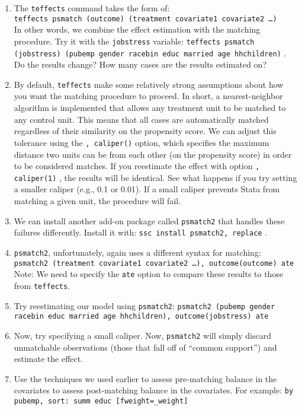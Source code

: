 \documentclass[a4paper,12pt]{article}
\begin{document}
\begin{enumerate}
\item The \texttt{teffects} command takes the form of:\\ \texttt{teffects psmatch (outcome) (treatment covariate1 covariate2 \dots)}\\ In other words, we combine the effect estimation with the matching procedure. Try it with the \texttt{jobstress} variable: \texttt{teffects psmatch (jobstress) (pubemp gender racebin educ married age hhchildren)} . Do the results change? How many cases are the results estimated on?
\item By default, \texttt{teffects} make some relatively strong assumptions about how you want the matching procedure to proceed. In short, a nearest-neighbor algorithm is implemented that allows any treatment unit to be matched to any control unit. This means that all cases are automatically matched regardless of their similarity on the propensity score. We can adjust this tolerance using the \texttt{, caliper()} option, which specifies the maximum distance two units can be from each other (on the propensity score) in order to be considered matches. If you reestimate the effect with option \texttt{, caliper(1)} , the results will be identical. See what happens if you try setting a smaller caliper (e.g., 0.1 or 0.01). If a small caliper prevents Stata from matching a given unit, the procedure will fail.

\item We can install another add-on package called \texttt{psmatch2} that handles these failures differently. Install it with: \texttt{ssc install psmatch2, replace} .
\item \texttt{psmatch2}, unfortunately, again uses a different syntax for matching:\\ \texttt{psmatch2 (treatment covariate1 covariate2 \dots), outcome(outcome) ate}\\ Note: We need to specify the \texttt{ate} option to compare these results to those from \texttt{teffects}.
\item Try reestimating our model using \texttt{psmatch2}: \texttt{psmatch2 (pubemp gender racebin educ married age hhchildren), outcome(jobstress) ate}
\item Now, try specifying a small caliper. Now, \texttt{psmatch2} will simply discard unmatchable observations (those that fall off of ``common support'') and estimate the effect.

\item Use the techniques we used earlier to assess pre-matching balance in the covariates to assess post-matching balance in the covariates. For example: \texttt{by pubemp, sort: summ educ [fweight=\_weight]}


\end{enumerate}
\end{document}
